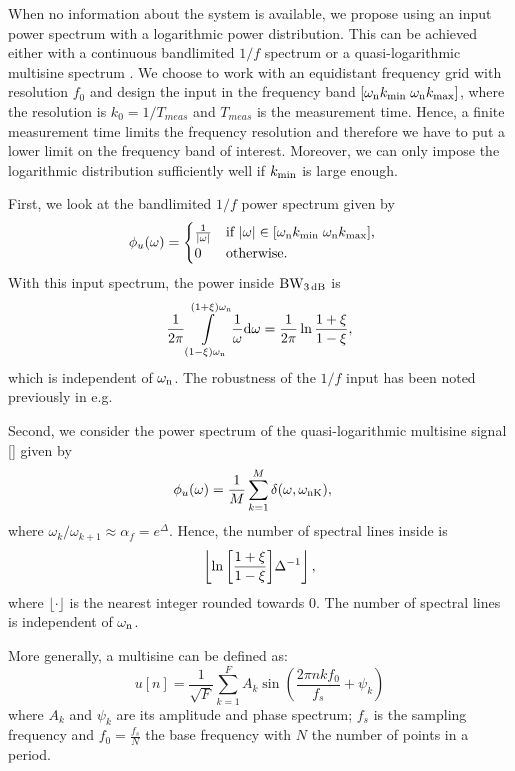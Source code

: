 When no information about the system is available, we propose using an input power spectrum with a logarithmic power distribution. This can be achieved either with a continuous bandlimited $1/f$ spectrum or a quasi-logarithmic multisine spectrum \citep{Pintelon2001}. We choose to work with an equidistant frequency grid with resolution $f_0$ and design the input in the frequency band $[\wn \kMin\; \wn \kMax]$, where the resolution is $k_0=1/T_{meas}$ and $T_{meas}$ is the measurement time. Hence, a finite measurement time limits the frequency resolution and therefore we have to put a lower limit on the frequency band of interest. Moreover, we can only impose the logarithmic distribution sufficiently well if $\kMin$ is large enough.

First, we look at the bandlimited $1/f$ power spectrum given by
\begin{align*}
\label{eq:pink}
\phi_u(\omega) &=\begin{cases}\frac{1}{|\omega|} &\text{if $|\omega|\in[\wn \kMin\; \wn \kMax]$,}\\
                        0           &\text{otherwise}.
            \end{cases}
\end{align*}
With this input spectrum, the power inside $\wdB$ is
\begin{align}
  \frac{1}{2\pi}
    \int\limits_{(1-\damping)\wn}^{(1+\damping)\wn}
     \frac{1}{\omega} \dd{\omega}
  = \frac{1}{2\pi}
    \ln{\frac{1+\damping}{1-\damping}},
\end{align}
which is independent of $\wn$. The robustness of the $1/f$ input has been noted previously in e.g. \cite{Rojas2007}

Second, we consider the power spectrum of the quasi-logarithmic multisine signal [\cite{Pintelon2001}] given by
\begin{align}
  \phi_u(\omega) &= \frac{1}{M}\sum_{k=1}^{M}{\delta(\omega,\wn[K])},
\end{align}
where $\omega_{k}/\omega_{k+1} \approx \alpha_{f} = e^{\Delta}$.
Hence, the number of spectral lines inside \wdB is 
\begin{align}
\left\lfloor\ln{\left[\frac{1+\damping}{1-\damping}\right]}\Delta^{-1}\right\rfloor,
\end{align}
where $\lfloor\cdot\rfloor$ is the nearest integer rounded towards $0$. The number of spectral lines is independent of $\wn$. 

More generally, a multisine can be defined as:
\begin{equation}
 u \left[ n\right] = \frac{1}{\sqrt{F}}
   \sum_{k=1}^{F} 
     A_k 
     \sin 
       \left(\frac{2\pi n k f_0}{f_s} + \psi_k \right)
  \label{eq:MS}
\end{equation}
where $A_k$ and $\psi_k$ are its amplitude and phase spectrum; $f_s$ is the
sampling frequency and $f_0 = \frac{f_s}{N}$ the base frequency with $N$ the 
number of points in a period. 

